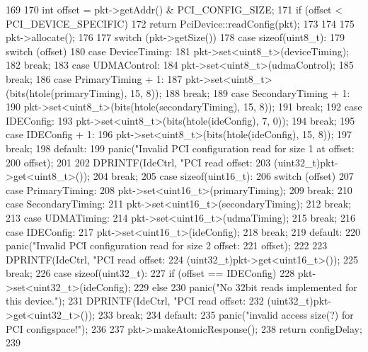 \begin{DoxyCode}
169 {
170     int offset = pkt->getAddr() & PCI_CONFIG_SIZE;
171     if (offset < PCI_DEVICE_SPECIFIC) {
172         return PciDevice::readConfig(pkt);
173     }
174 
175     pkt->allocate();
176 
177     switch (pkt->getSize()) {
178       case sizeof(uint8_t):
179         switch (offset) {
180           case DeviceTiming:
181             pkt->set<uint8_t>(deviceTiming);
182             break;
183           case UDMAControl:
184             pkt->set<uint8_t>(udmaControl);
185             break;
186           case PrimaryTiming + 1:
187             pkt->set<uint8_t>(bits(htole(primaryTiming), 15, 8));
188             break;
189           case SecondaryTiming + 1:
190             pkt->set<uint8_t>(bits(htole(secondaryTiming), 15, 8));
191             break;
192           case IDEConfig:
193             pkt->set<uint8_t>(bits(htole(ideConfig), 7, 0));
194             break;
195           case IDEConfig + 1:
196             pkt->set<uint8_t>(bits(htole(ideConfig), 15, 8));
197             break;
198           default:
199             panic("Invalid PCI configuration read for size 1 at offset: %
200                     offset);
201         }
202         DPRINTF(IdeCtrl, "PCI read offset: %
203                 (uint32_t)pkt->get<uint8_t>());
204         break;
205       case sizeof(uint16_t):
206         switch (offset) {
207           case PrimaryTiming:
208             pkt->set<uint16_t>(primaryTiming);
209             break;
210           case SecondaryTiming:
211             pkt->set<uint16_t>(secondaryTiming);
212             break;
213           case UDMATiming:
214             pkt->set<uint16_t>(udmaTiming);
215             break;
216           case IDEConfig:
217             pkt->set<uint16_t>(ideConfig);
218             break;
219           default:
220             panic("Invalid PCI configuration read for size 2 offset: %
221                     offset);
222         }
223         DPRINTF(IdeCtrl, "PCI read offset: %
224                 (uint32_t)pkt->get<uint16_t>());
225         break;
226       case sizeof(uint32_t):
227         if (offset == IDEConfig)
228             pkt->set<uint32_t>(ideConfig);
229         else
230             panic("No 32bit reads implemented for this device.");
231         DPRINTF(IdeCtrl, "PCI read offset: %
232                 (uint32_t)pkt->get<uint32_t>());
233         break;
234       default:
235         panic("invalid access size(?) for PCI configspace!\n");
236     }
237     pkt->makeAtomicResponse();
238     return configDelay;
239 }
\end{DoxyCode}
